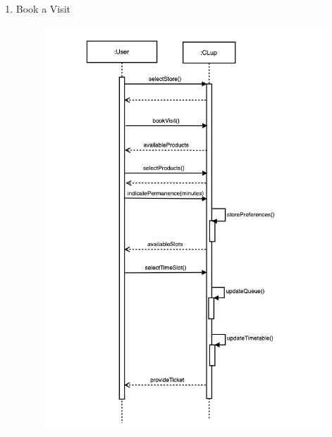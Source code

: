 \documentclass[]{article}
\begin{document}
						\begin{enumerate}
						
						\item Book a Visit
							\begin{figure}[H]
								\centering
								\includegraphics[scale=1.1]{BookAVisit.png}
								\caption{}
								\label{fig:bookavisit_sequencediagram}
							\end{figure}
							\newpage
						

\end{enumerate}
\end{document}
